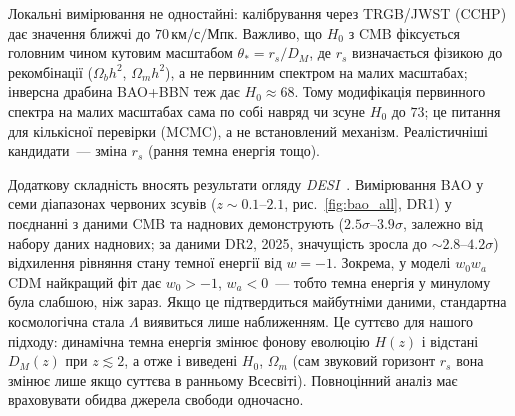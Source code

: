 Локальні вимірювання не одностайні: калібрування через TRGB/JWST (CCHP) дає значення ближчі до $70\,\text{км/с/Мпк}$. Важливо, що $H_0$ з CMB фіксується головним чином кутовим масштабом $\theta_*=r_s/D_M$, де $r_s$ визначається фізикою до рекомбінації ($\Omega_bh^2$, $\Omega_mh^2$), а не первинним спектром на малих масштабах; інверсна драбина BAO+BBN теж дає $H_0\approx 68$. Тому модифікація первинного спектра на малих масштабах сама по собі навряд чи зсуне $H_0$ до $73$; це питання для кількісної перевірки (MCMC), а не встановлений механізм. Реалістичніші кандидати~--- зміна $r_s$ (рання темна енергія тощо).

Додаткову складність вносять результати огляду \emph{DESI}~\cite{DESI2024}. Вимірювання BAO у семи діапазонах червоних зсувів ($z \sim 0.1$--$2.1$, рис.~\ref{fig:bao_all}, DR1) у поєднанні з даними CMB та наднових демонструють ($2.5\sigma$--$3.9\sigma$, залежно від набору даних наднових; за даними DR2, 2025, значущість зросла до $\sim 2.8$--$4.2\sigma$) відхилення рівняння стану темної енергії від $w=-1$. Зокрема, у моделі $w_0 w_a$CDM найкращий фіт дає $w_0 > -1$, $w_a < 0$~--- тобто темна енергія у минулому була слабшою, ніж зараз. Якщо це підтвердиться майбутніми даними, стандартна космологічна стала $\Lambda$ виявиться лише наближенням. Це суттєво для нашого підходу: динамічна темна енергія змінює фонову еволюцію $H(z)$ і відстані $D_M(z)$ при $z\lesssim2$, а отже і виведені $H_0$, $\Omega_m$ (сам звуковий горизонт $r_s$ вона змінює лише якщо суттєва в ранньому Всесвіті). Повноцінний аналіз має враховувати обидва джерела свободи одночасно.




